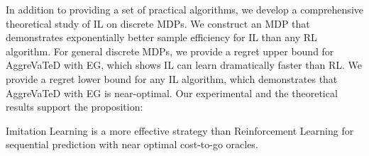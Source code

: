 \documentclass{article}
\newcommand{\BB}[1]{\textcolor{red}{\bf Byron: {#1}}}
\newcommand{\drew}[1]{\textcolor{blue}{\bf Drew: {#1}}}
\begin{document}

In addition to providing a set of practical algorithms, we develop a comprehensive theoretical study of IL on discrete MDPs. We construct an MDP that demonstrates exponentially better sample efficiency for IL than any RL algorithm. For general discrete MDPs, we provide a regret upper bound for AggreVaTeD with EG, which shows IL can learn dramatically faster than RL. We provide a regret lower bound for any IL algorithm, which demonstrates that AggreVaTeD with EG is near-optimal. Our experimental and the theoretical results support the proposition: 
\begin{displayquote}
Imitation Learning is a more effective strategy than Reinforcement Learning for sequential prediction with near optimal cost-to-go oracles.
\end{displayquote}




\end{document}
